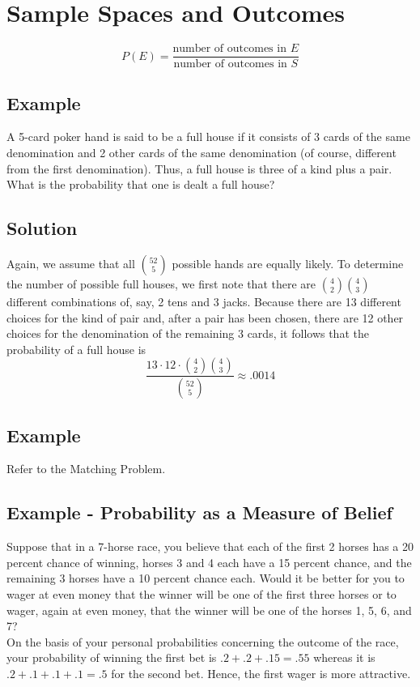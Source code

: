 \section{Sample Spaces and Outcomes}
$$P(E) = \frac{\text{number of outcomes in }E}{\text{number of outcomes in }S}$$
\subsection*{Example}
A 5-card poker hand is said to be a full house if it consists of 3 cards of the same
denomination and 2 other cards of the same denomination (of course, different
from the first denomination). Thus, a full house is three of a kind plus a pair. What
is the probability that one is dealt a full house?
\subsection*{Solution}
Again, we assume that all $52\choose 5$ possible hands are equally likely. To determine
the number of possible full houses, we first note that there are ${4\choose 2}{4\choose 3}$ different
combinations of, say, 2 tens and 3 jacks. Because there are 13 different choices
for the kind of pair and, after a pair has been chosen, there are 12 other choices
for the denomination of the remaining 3 cards, it follows that the probability of a
full house is \[\frac{13\cdot 12\cdot {4\choose 2}{4\choose 3}}{{52\choose 5}}\approx .0014\]
\subsection*{Example}
Refer to the Matching Problem.
\subsection*{Example - Probability as a Measure of Belief}
Suppose that in a 7-horse race, you believe that each of the first 2 horses has a
20 percent chance of winning, horses 3 and 4 each have a 15 percent chance,
and the remaining 3 horses have a 10 percent chance each. Would it be better
for you to wager at even money that the winner will be one of the first three
horses or to wager, again at even money, that the winner will be one of the
horses 1, 5, 6, and 7?\\
On the basis of your personal probabilities concerning the outcome of the race,
your probability of winning the first bet is $.2+.2+.15 = .55$ whereas it is $.2+.1+.1+.1 = .5$
for the second bet. Hence, the first wager is more attractive.
